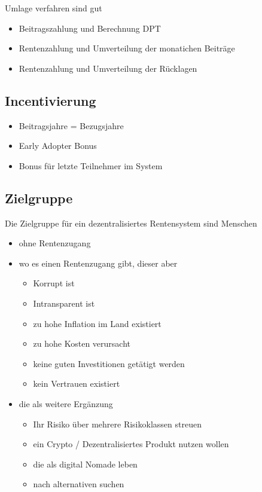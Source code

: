 Umlage verfahren sind gut 
\begin{itemize}
\item Beitragszahlung und Berechnung DPT
\item Rentenzahlung und Umverteilung der monatichen Beiträge
\item Rentenzahlung und Umverteilung der Rücklagen
\end{itemize}



\subsection{Incentivierung}

\begin{itemize}
\item Beitragsjahre = Bezugsjahre
\item Early Adopter Bonus
\item Bonus für letzte Teilnehmer im System
\end{itemize}


\subsection{Zielgruppe}

Die Zielgruppe für ein dezentralisiertes Rentensystem sind Menschen

\begin{itemize}
\item ohne Rentenzugang
\item wo es einen Rentenzugang gibt, dieser aber 
 \begin{itemize}
 \item Korrupt ist
 \item Intransparent ist
 \item zu hohe Inflation im Land existiert
 \item zu hohe Kosten verursacht
 \item keine guten Investitionen getätigt werden
 \item kein Vertrauen existiert
 \end{itemize}
\item die als weitere Ergänzung 
 \begin{itemize}
 \item Ihr Risiko über mehrere Risikoklassen streuen
 \item ein Crypto / Dezentralisiertes Produkt nutzen wollen
 \item die als digital Nomade leben
 \item nach alternativen suchen
 \end{itemize}
\end{itemize}


